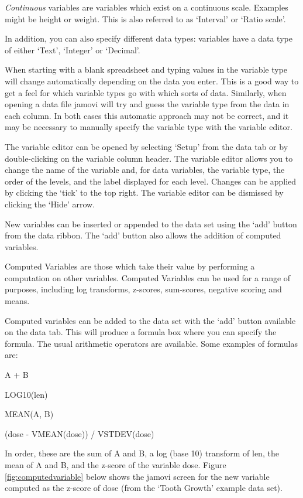 {\it Continuous} variables are variables which exist on a continuous scale. Examples might be height or weight. This is also referred to as ‘Interval’ or ‘Ratio scale’.

In addition, you can also specify different data types: variables have a data type of either ‘Text’, ‘Integer’ or ‘Decimal’. 

When starting with a blank spreadsheet and typing values in the variable type will change automatically depending on the data you enter. This is a good way to get a feel for which variable types go with which sorts of data. Similarly, when opening a data file jamovi will try and guess the variable type from the data in each column. In both cases this automatic approach may not be correct, and it may be necessary to manually specify the variable type with the variable editor.

The variable editor can be opened by selecting ‘Setup’ from the data tab or by double-clicking on the variable column header. The variable editor allows you to change the name of the variable and, for data variables, the variable type, the order of the levels, and the label displayed for each level. Changes can be applied by clicking the ‘tick’ to the top right. The variable editor can be dismissed by clicking the `Hide' arrow.

New variables can be inserted or appended to the data set using the ‘add’ button from the data ribbon. The ‘add’ button also allows the addition of computed variables.


Computed Variables are those which take their value by performing a computation on other variables. Computed Variables can be used for a range of purposes, including log transforms, z-scores, sum-scores, negative scoring and means.

Computed variables can be added to the data set with the ‘add’ button available on the data tab. This will produce a formula box where you can specify the formula. The usual arithmetic operators are available. Some examples of formulas are:

A + B

LOG10(len)

MEAN(A, B)

(dose - VMEAN(dose)) / VSTDEV(dose)

In order, these are the sum of A and B, a log (base 10) transform of len, the mean of A and B, and the z-score of the variable dose. Figure \ref{fig:computedvariable} below shows the jamovi screen for the new variable computed as the z-score of dose (from the `Tooth Growth' example data set).

